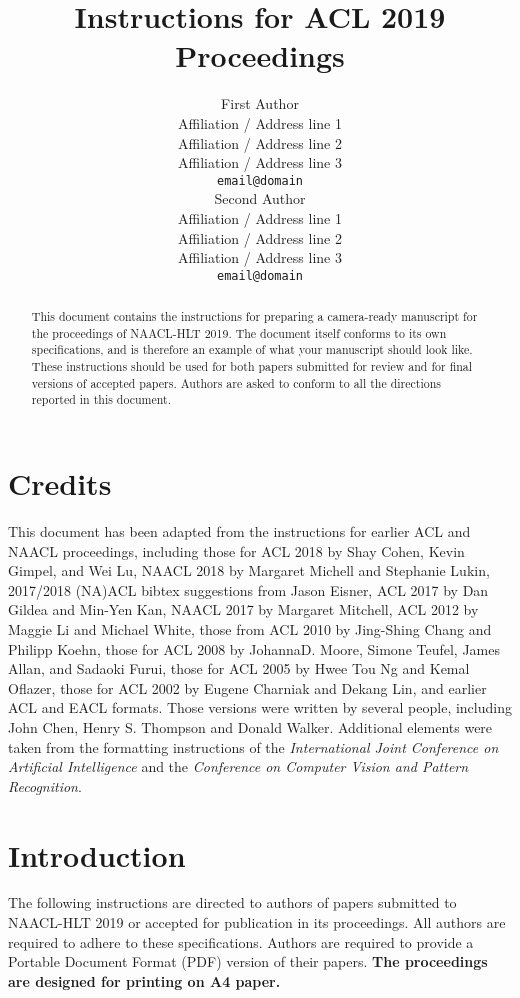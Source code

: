 \documentclass[11pt,a4paper]{article}
\title{Instructions for ACL 2019 Proceedings}
\author{First Author \\
  Affiliation / Address line 1 \\
  Affiliation / Address line 2 \\
  Affiliation / Address line 3 \\
  {\tt email@domain} \\\And
  Second Author \\
  Affiliation / Address line 1 \\
  Affiliation / Address line 2 \\
  Affiliation / Address line 3 \\
  {\tt email@domain} \\}
\date{}
\begin{document}
\maketitle
\begin{abstract}
  This document contains the instructions for preparing a camera-ready
  manuscript for the proceedings of NAACL-HLT 2019. The document itself
  conforms to its own specifications, and is therefore an example of
  what your manuscript should look like. These instructions should be
  used for both papers submitted for review and for final versions of
  accepted papers.  Authors are asked to conform to all the directions
  reported in this document.
\end{abstract}

\section{Credits}

This document has been adapted from the instructions
for earlier ACL and NAACL proceedings,
including 
those for ACL 2018 by Shay Cohen, Kevin Gimpel, and Wei Lu, 
NAACL 2018 by Margaret Michell and Stephanie Lukin,
2017/2018 (NA)ACL bibtex suggestions from Jason Eisner,
ACL 2017 by Dan Gildea and Min-Yen Kan, 
NAACL 2017 by Margaret Mitchell, 
ACL 2012 by Maggie Li and Michael White, 
those from ACL 2010 by Jing-Shing Chang and Philipp Koehn, 
those for ACL 2008 by JohannaD. Moore, Simone Teufel, James Allan, and Sadaoki Furui, 
those for ACL 2005 by Hwee Tou Ng and Kemal Oflazer, 
those for ACL 2002 by Eugene Charniak and Dekang Lin, 
and earlier ACL and EACL formats.
Those versions were written by several
people, including John Chen, Henry S. Thompson and Donald
Walker. Additional elements were taken from the formatting
instructions of the {\em International Joint Conference on Artificial
  Intelligence} and the \emph{Conference on Computer Vision and
  Pattern Recognition}.

\section{Introduction}

The following instructions are directed to authors of papers submitted
to NAACL-HLT 2019 or accepted for publication in its proceedings. All
authors are required to adhere to these specifications. Authors are
required to provide a Portable Document Format (PDF) version of their
papers. \textbf{The proceedings are designed for printing on A4
paper.}
\end{document}

